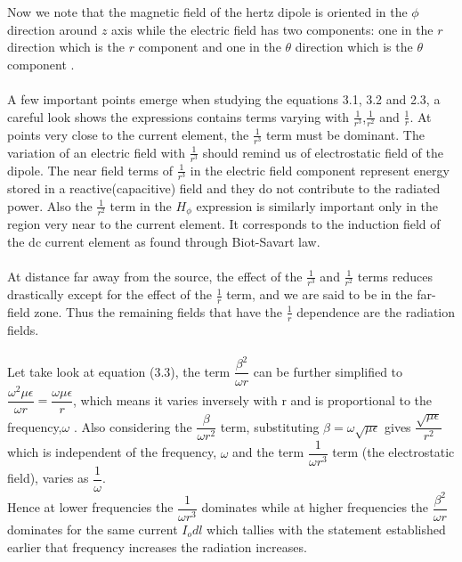 	Now we note that the magnetic field of the hertz dipole is oriented in the $\phi$ direction around $z$ axis while the electric field has two components: one in the $r$ direction which is the $r$ component and one in the $\theta$ direction which is the $\theta$ component .
	\paragraph*{} A few important points emerge when studying the equations 3.1, 3.2 and 2.3, a careful look shows the expressions contains terms varying with $\frac{1}{r^3}$,$\frac{1}{r^2}$ and $\frac{1}{r}$. At points very close to the current element, the  $\frac{1}{r^3}$ term must be dominant. The variation of an electric field with  $\frac{1}{r^3}$ should remind us of electrostatic field of the dipole. The near field terms of  $\frac{1}{r^3}$ in the electric field component represent energy stored in a reactive(capacitive) field and they do not contribute to the radiated power. Also the  $\frac{1}{r^2}$ term in the $H_\phi$ expression is similarly important only in the region very near to the current element. It corresponds to the induction field of the dc current element as found through Biot-Savart law. 
	\paragraph*{} At distance far away from the source, the effect of the  $\frac{1}{r^3}$ and  $\frac{1}{r^2}$ terms reduces drastically except for the effect of the  $\frac{1}{r}$ term, and we are said to be in the far-field zone. Thus the remaining fields that have the  $\frac{1}{r}$ dependence are the radiation fields. 
	\paragraph*{} Let take look at equation (3.3), the term $\dfrac{\beta^2}{\omega r}$ can be further simplified to $\dfrac{\omega ^2\mu\epsilon}{\omega r} = \dfrac{\omega \mu \epsilon}{r}$, which means it varies inversely with r and is proportional to the frequency,$\omega$ . Also considering the $\dfrac{\beta}{\omega r^2}$ term, substituting $\beta = \omega \sqrt{\mu \epsilon}$ gives $\dfrac{\sqrt{\mu \epsilon}}{r^2}$ which is independent of the frequency, $\omega$ and the term $\dfrac{1}{\omega r^3}$ term (the electrostatic field), varies as $\dfrac{1}{\omega }$. \\ 
	Hence at lower frequencies the $\dfrac{1}{\omega r^3}$ dominates while at higher frequencies the $\dfrac{\beta^2}{\omega r}$ dominates for the same current $I_odl$ which tallies with the statement established earlier that frequency increases the radiation increases. 
